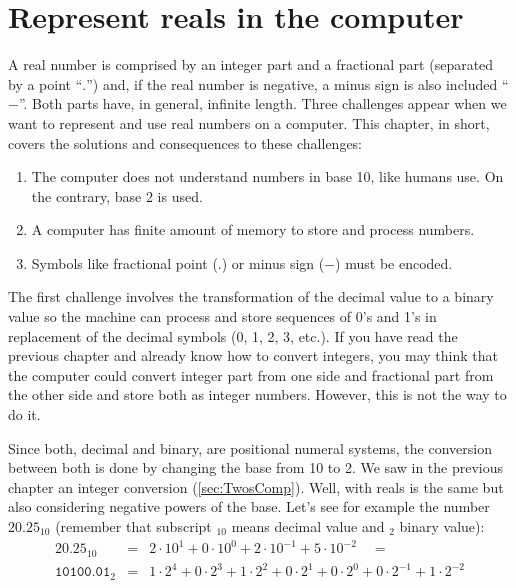     \section{Represent reals in the computer}
 
A real number is comprised by an integer part and a fractional part (separated by a point ``$.$'') and, if the real number is negative, a minus sign is also included ``$-$''.
Both parts have, in general, infinite length. 
Three challenges appear when we want to represent and use real numbers on a computer. 
This chapter, in short, covers the solutions and consequences to these challenges:
\begin{enumerate}
    \item The computer does not understand numbers in base 10, like humans use. On the contrary, base 2 is used. 
    \item A computer has finite amount of memory to store and process numbers.
    \item Symbols like fractional point ($.$) or minus sign ($-$) must be encoded. 
\end{enumerate}
 
The first challenge involves the transformation of the decimal value to a binary value so the machine can process and store sequences of 0's and 1's in replacement of the decimal symbols (0, 1, 2, 3, etc.).
If you have read the previous chapter and already know how to convert integers, you may think that the computer could convert integer part from one side and fractional part from the other side and store both as integer numbers. However, this is not the way to do it. 

Since both, decimal and binary, are positional numeral systems, the conversion between both is done by changing the base from 10 to 2. 
We saw in the previous chapter an integer conversion (\ref{sec:TwosComp}). Well, with reals is the same but also considering negative powers of the base. 
Let's see for example the number $20.25_{10}$ (remember that subscript $_{10}$ means decimal value and $_2$ binary value):
\begin{eqnarray*}
    20.25_{10} &=& 2\cdot 10^1 + 0\cdot 10^0+ 2\cdot 10^{-1}+ 5\cdot 10^{-2} \quad = \\
    \texttt{10100.01}_{2} &=& 1\cdot 2^4 +0\cdot 2^3+ 1\cdot 2^2+ 0\cdot 2^1+ 0\cdot 2^0+ 0\cdot 2^{-1}+  1\cdot 2^{-2} 
\end{eqnarray*} 


